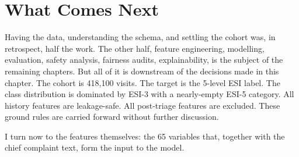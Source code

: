 \section{What Comes Next}

Having the data, understanding the schema, and settling the cohort was, in retrospect, half the work. The other half, feature engineering, modelling, evaluation, safety analysis, fairness audits, explainability, is the subject of the remaining chapters. But all of it is downstream of the decisions made in this chapter. The cohort is 418,100 visits. The target is the 5-level ESI label. The class distribution is dominated by ESI-3 with a nearly-empty ESI-5 category. All history features are leakage-safe. All post-triage features are excluded. These ground rules are carried forward without further discussion.

I turn now to the features themselves: the 65 variables that, together with the chief complaint text, form the input to the model.
